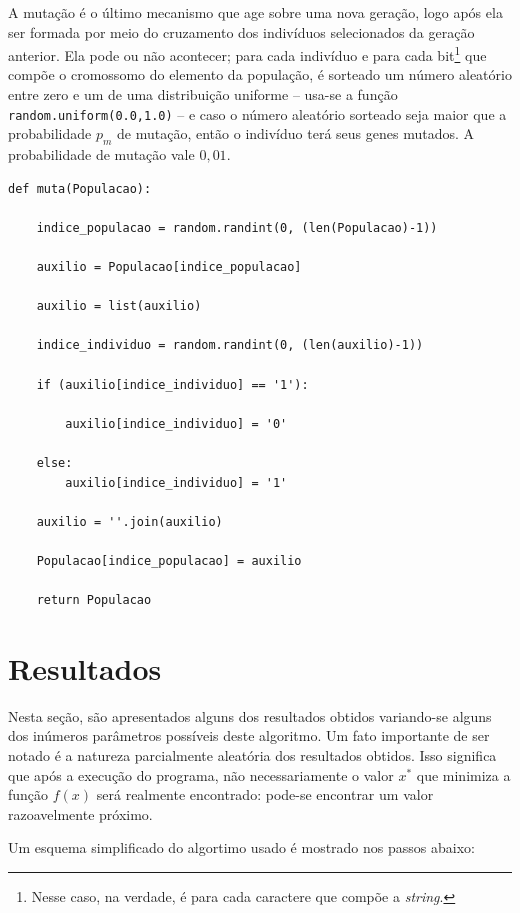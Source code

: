 \documentclass[11pt]{article}
\begin{document}
A mutação é o último mecanismo que age sobre uma nova geração, logo após ela ser formada por meio do cruzamento dos indivíduos selecionados da geração anterior. Ela pode ou não acontecer; para cada indivíduo e para cada bit\footnote{Nesse caso, na verdade, é para cada caractere que compõe a \emph{string}.} que compõe o cromossomo do elemento da população, é sorteado um número aleatório entre zero e um de uma distribuição uniforme -- usa-se a função \texttt{random.uniform(0.0,1.0)} -- e caso o número aleatório sorteado seja maior que a probabilidade $p_m$ de mutação, então o indivíduo terá seus genes mutados. A probabilidade de mutação vale $0,01$.

\begin{lstlisting}
def muta(Populacao):
	
	indice_populacao = random.randint(0, (len(Populacao)-1))
	
	auxilio = Populacao[indice_populacao]
	
	auxilio = list(auxilio)
	
	indice_individuo = random.randint(0, (len(auxilio)-1))
	
	if (auxilio[indice_individuo] == '1'):
		
		auxilio[indice_individuo] = '0'
	
	else:
		auxilio[indice_individuo] = '1'
	
	auxilio = ''.join(auxilio)

	Populacao[indice_populacao] = auxilio
	
	return Populacao
\end{lstlisting}

\section{Resultados}\label{sec:resultados}

Nesta seção, são apresentados alguns dos resultados obtidos variando-se alguns dos inúmeros parâmetros possíveis deste algoritmo. Um fato importante de ser notado é a natureza parcialmente aleatória dos resultados obtidos. Isso significa que após a execução do programa, não necessariamente o valor $x^*$ que minimiza a função $f(x)$ será realmente encontrado: pode-se encontrar um valor razoavelmente próximo.

Um esquema simplificado do algortimo usado é mostrado nos passos abaixo:
\end{document}
